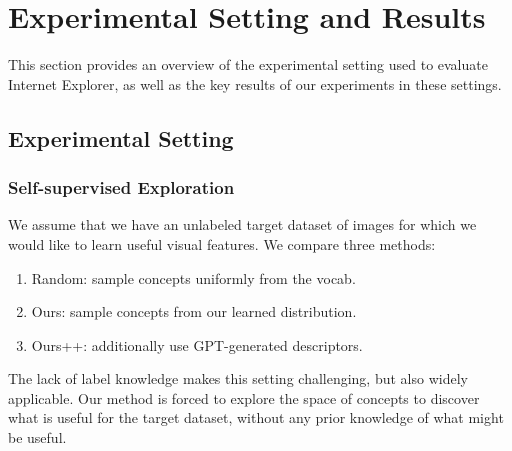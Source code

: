 \chapter{Experimental Setting and Results}
This section provides an overview of the experimental setting used to evaluate Internet Explorer, as well as the key results of our experiments in these settings.

\section{Experimental Setting}
\subsection{Self-supervised Exploration}
We assume that we have an unlabeled target dataset of images for which we would like to learn useful visual features. We compare three methods:
\begin{enumerate}[noitemsep,topsep=0pt]
    \item Random: sample concepts uniformly from the vocab. 
    \item Ours: sample concepts from our learned distribution. 
    \item Ours++: additionally use GPT-generated descriptors.
\end{enumerate}
The lack of label knowledge makes this setting challenging, but also widely applicable. Our method is forced to explore the space of concepts to discover what is useful for the target dataset, without any prior knowledge of what might be useful.

